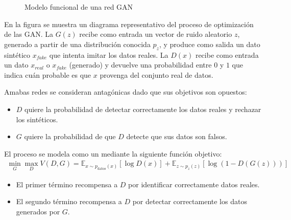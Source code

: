 \documentclass[a4paper,10pt,spanish]{jupyterBook}
\begin{document}
\begin{figure}[htbp]
\centering
\capstart

\noindent{}
\caption{Modelo funcional de una red GAN}\label{\detokenize{content/02/CTGAN:figura-2-1}}\end{figure}

\sphinxAtStartPar
En la figura se muestra un diagrama representativo del proceso de optimización de las GAN. La  \(G(z)\) recibe como entrada un vector de ruido aleatorio \(z\), generado a partir de una distribución conocida \(p_z\), y produce como salida un dato sintético \(x_{fake}\) que intenta imitar los datos reales. La  \(D(x)\) recibe como entrada un dato \(x_{real}\)  o \(x_{fake}\) (generado) y devuelve una probabilidad  entre \(0\) y \(1\) que indica cuán probable es que \(x\) provenga del conjunto real de datos.

\sphinxAtStartPar
Amabas redes se consideran antagónicas dado que sus objetivos son opuestos:
\begin{itemize}
\item {}
\sphinxAtStartPar
\(D\) quiere  la probabilidad de detectar correctamente los datos reales y rechazar los sintéticos.

\item {}
\sphinxAtStartPar
\(G\) quiere  la probabilidad de que \(D\) detecte que sus datos son falsos.

\end{itemize}

\sphinxAtStartPar
El proceso se modela como un  mediante la siguiente función objetivo:
\begin{equation*}
\begin{split}
\min_G \max_D V(D, G) = \mathbb{E}_{x \sim p_{\text{datos}}(x)}[\log D(x)] + \mathbb{E}_{z \sim p_z(z)}[\log(1 - D(G(z)))]
\end{split}
\end{equation*}\begin{itemize}
\item {}
\sphinxAtStartPar
El primer término recompensa a \(D\) por identificar correctamente datos reales.

\item {}
\sphinxAtStartPar
El segundo término recompensa a \(D\) por detectar correctamente los datos generados por \(G\).

\end{itemize}
\end{document}
